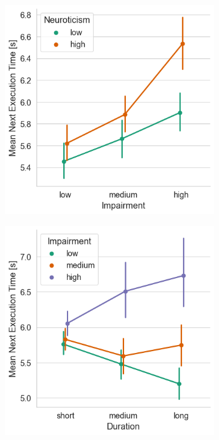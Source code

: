 \begin{figure}
    \centering%
    \begin{subfigure}[t]{.28\textwidth}
        \centering
        \includegraphics[width=\textwidth]{./model_data/imp_neur_vs_exectime.png}
        \caption{}\label{fig:timing:impneurvsetime}
    \end{subfigure}%
    \hspace{\fill}%
    \begin{subfigure}[t]{.28\textwidth}
        \centering
        \includegraphics[width=\textwidth]{./model_data/duration_vs_exectime.png}

\end{subfigure}
\end{figure}
